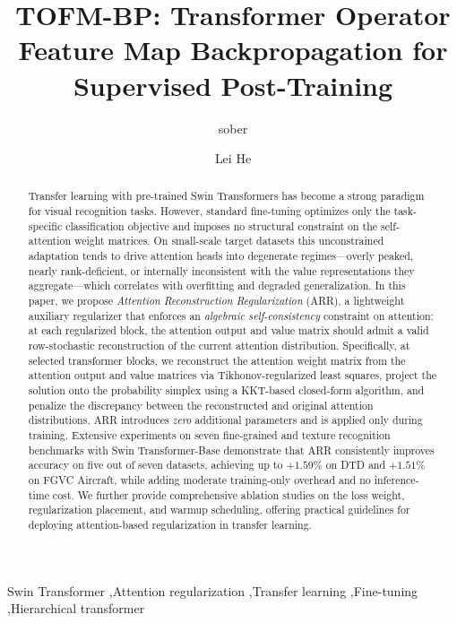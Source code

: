 \documentclass[review,12pt,authoryear]{elsarticle}
\newcommand{\method}{ARR}
\begin{document}
\linenumbers

\begin{frontmatter}

\title{TOFM-BP: Transformer Operator Feature Map Backpropagation for Supervised Post-Training}

\author[addr1,addr2,addr3]{sober}
\author[addr1,addr2]{Lei He}

\address[addr1]{School of Vehicle and Mobility, Tsinghua University, Beijing, China}
\address[addr2]{State Key Laboratory of Intelligent Green Vehicle and Mobility, Tsinghua University, Beijing, China}
\address[addr3]{School of Mathematical Sciences, Beijing University of Posts and Telecommunications, Beijing, China}

\begin{abstract}
Transfer learning with pre-trained Swin Transformers has become a strong paradigm for visual recognition tasks.
However, standard fine-tuning optimizes only the task-specific classification objective and imposes no structural constraint on the self-attention weight matrices.
On small-scale target datasets this unconstrained adaptation tends to drive attention heads into degenerate regimes---overly peaked, nearly rank-deficient, or internally inconsistent with the value representations they aggregate---which correlates with overfitting and degraded generalization.
In this paper, we propose \emph{Attention Reconstruction Regularization} (\method{}), a lightweight auxiliary regularizer that enforces an \emph{algebraic self-consistency} constraint on attention: at each regularized block, the attention output and value matrix should admit a valid row-stochastic reconstruction of the current attention distribution.
Specifically, at selected transformer blocks, we reconstruct the attention weight matrix from the attention output and value matrices via Tikhonov-regularized least squares, project the solution onto the probability simplex using a KKT-based closed-form algorithm, and penalize the discrepancy between the reconstructed and original attention distributions.
\method{} introduces \emph{zero} additional parameters and is applied only during training.
Extensive experiments on seven fine-grained and texture recognition benchmarks with Swin Transformer-Base demonstrate that \method{} consistently improves accuracy on five out of seven datasets, achieving up to $+1.59\%$ on DTD and $+1.51\%$ on FGVC Aircraft, while adding moderate training-only overhead and no inference-time cost.
We further provide comprehensive ablation studies on the loss weight, regularization placement, and warmup scheduling, offering practical guidelines for deploying attention-based regularization in transfer learning.
\end{abstract}

\begin{keyword}
Swin Transformer \sep Attention regularization \sep Transfer learning \sep Fine-tuning \sep Hierarchical transformer
\end{keyword}

\end{frontmatter}
\end{document}
